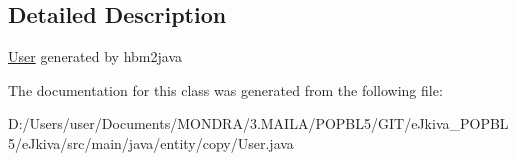 \subsection{Detailed Description}
\mbox{\hyperlink{classentity_1_1copy_1_1_user}{User}} generated by hbm2java 

The documentation for this class was generated from the following file\+:\begin{DoxyCompactItemize}
\item 
D\+:/\+Users/user/\+Documents/\+M\+O\+N\+D\+R\+A/3.\+M\+A\+I\+L\+A/\+P\+O\+P\+B\+L5/\+G\+I\+T/e\+Jkiva\+\_\+\+P\+O\+P\+B\+L5/e\+Jkiva/src/main/java/entity/copy/User.\+java\end{DoxyCompactItemize}
